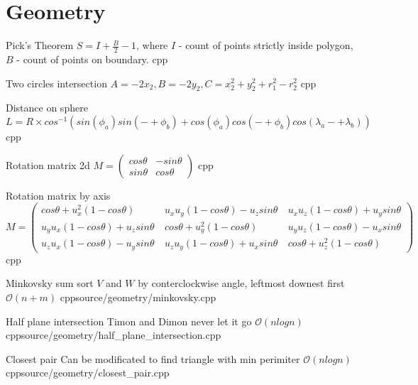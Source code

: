 \documentclass[landscape, 10pt, a4paper, oneside, twocolumn]{extarticle}
\begin{document}
\section{Geometry}

\Algorithm
{Pick's Theorem}
{$S = I + \frac{B}{2} - 1$, where $I$ - count of points strictly inside polygon, $B$ - count of points on boundary.}
{}
{cpp}{}

\Algorithm
{Two circles intersection}
{$A = -2 x_{2}, B = - 2 y_{2}, C = x_{2}^{2} + y_{2}^{2} + r_{1}^{2} - r_{2}^{2}$}
{}
{cpp}{}

\Algorithm
{Distance on sphere}
{$L = R \times cos^{-1}( sin(\phi_{a}) sin(-+ \phi_{b}) + cos(\phi_{a}) cos(-+ \phi_{b}) cos(\lambda_{a} -+ \lambda_{b}) ) $}
{}
{cpp}{}

\Algorithm
{Rotation matrix 2d}
{$M = \left( \begin{smallmatrix} cos\theta & - sin\theta \\ sin\theta & cos\theta \end{smallmatrix} \right)$}
{}
{cpp}{}

\Algorithm
{Rotation matrix by axis}
{$M = \left( \begin{smallmatrix} cos\theta + u_{x}^{2} (1 - cos\theta) \  & u_{x} u_{y} (1 - cos\theta) - u_{z} sin\theta \ & u_{x} u_{z} (1 - cos\theta) + u_{y} sin\theta \\ u_{y} u_{x} (1 - cos\theta) + u_{z} sin\theta \ & cos\theta + u_{y}^{2} (1 - cos\theta) \ & u_{y} u_{z} (1 - cos\theta) - u_{x} sin\theta \\ u_{z} u_{x} (1 - cos\theta) - u_{y} sin\theta \ & u_{z} u_{y} (1 - cos\theta) + u_{x} sin\theta \ & cos\theta + u_{z}^{2} (1 - cos\theta) \end{smallmatrix} \right)$}
{}
{cpp}{}

\Algorithm
{Minkovsky sum}
{sort $V$ and $W$ by conterclockwise angle, leftmost downest first}
{$\mathcal{O}(n + m)$}
{cpp}{source/geometry/minkovsky.cpp}

\Algorithm
{Half plane intersection}
{Timon and Dimon never let it go}
{$\mathcal{O}(n logn)$}
{cpp}{source/geometry/half_plane_intersection.cpp}

\Algorithm
{Closest pair}
{Can be modificated to find triangle with min perimiter}
{$\mathcal{O}(n logn)$}
{cpp}{source/geometry/closest_pair.cpp}

\end{document}
